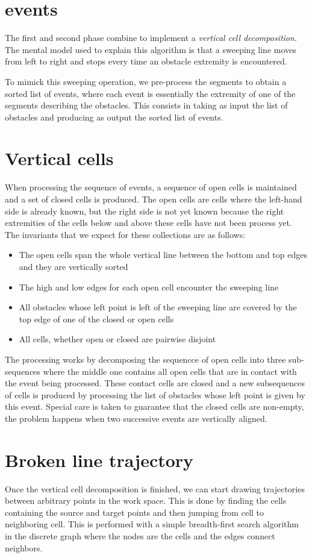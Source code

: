 \documentclass{easychair}
\begin{document}
\section{events}
The first and second phase combine to implement a {\em vertical cell decomposition}.
The mental model used to explain this algorithm is that a sweeping line moves from
left to right and stops every time an obstacle extremity is encountered.

To mimick this sweeping operation, we pre-process the segments
to obtain a sorted list of events, where each event is essentially the extremity
of one of the segments describing the obstacles.  This consists in taking as input
the list of obstacles and producing as output the sorted list of events.
\section{Vertical cells}
When processing the sequence of events, a sequence of open cells is maintained and a set
of closed cells is produced.  The open cells are cells where
the left-hand side is already known, but the right side is not yet known because
the right extremities of the cells below and above these cells have not been process
yet.  The invariants that we expect for these collections are as follows:
\begin{itemize}
\item The open cells span the whole vertical line between the bottom and top edges
and they are vertically sorted
\item The high and low edges for each open cell encounter the sweeping line
\item All obstacles whose left point is left of the sweeping line are covered by the
top edge of one of the closed or open cells
\item All cells, whether open or closed are pairwise disjoint
\end{itemize}
The processing works by decomposing the sequencce of open cells into three sub-sequences
where the middle one contains all open cells that are in contact with the event being
processed.  These contact cells are closed and a new subsequences of cells is produced by
processing the list of obstacles whose left point is given by this event.  Special care
is taken to guarantee that the closed cells are non-empty, the problem happens when
two successive events are vertically aligned.
\section{Broken line trajectory}
Once the vertical cell decomposition is finished, we can start drawing trajectories
between arbitrary points in the work space.  This is done by finding the cells containing
the source and target points and then jumping from cell to neighboring
cell.  This is performed with a simple breadth-first search algorithm in the discrete graph
where the nodes are the cells and the edges connect neighbors.
\end{document}
